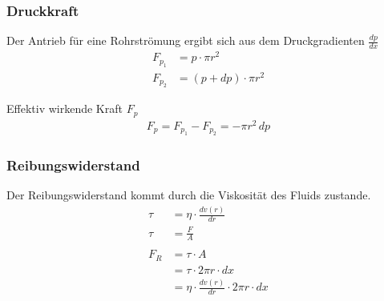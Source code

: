 \documentclass[a4paper,11pt]{article}
\begin{document}
\begin{marginfigure}
{
}
\caption{Schematische Darstellung; Annahme: inkompressibles, newtonsches Fluid}
\end{marginfigure}


\subsubsection*{Druckkraft}
Der Antrieb für eine Rohrströmung ergibt sich aus dem Druckgradienten $\frac{dp}{dx}$
\begin{align*}
F_{p_1} &= p \cdot \pi r^2 \\
F_{p_2} &= (p + dp) \cdot \pi r^2
\end{align*}

Effektiv wirkende Kraft $F_p$
\begin{align*}
F_p = F_{p_1} - F_{p_2} = -\pi r^2 \, dp
\end{align*}


\subsubsection*{Reibungswiderstand}
Der Reibungswiderstand kommt durch die Viskosität des Fluids zustande.
\begin{align*}
\tau &= \eta \cdot \frac{dv(r)}{dr} \\
\tau &= \frac{F}{A} \\ \\
F_R &= \tau \cdot A \\
&= \tau \cdot 2\pi r \cdot dx \\
&= \eta \cdot \frac{dv(r)}{dr} \cdot 2\pi r \cdot dx
\end{align*}
\end{document}
